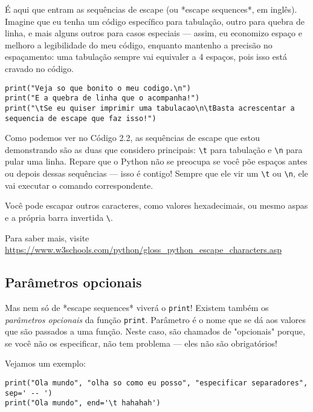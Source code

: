 \documentclass[12pt]{book}
\begin{document}
	É aqui que entram as sequências de escape (ou *escape sequences*, em inglês). Imagine que eu tenha um código específico para tabulação, outro para quebra de linha, e mais alguns outros para casos especiais — assim, eu economizo espaço e melhoro a legibilidade do meu código, enquanto mantenho a precisão no espaçamento: uma tabulação sempre vai equivaler a 4 espaços, pois isso está cravado no código.
	
	\begin{lstlisting}[caption={Sequências de escape}]
print("Veja so que bonito o meu codigo.\n")
print("E a quebra de linha que o acompanha!")
print("\tSe eu quiser imprimir uma tabulacao\n\tBasta acrescentar a sequencia de escape que faz isso!")\end{lstlisting}
	
	Como podemos ver no Código 2.2, as sequências de escape que estou demonstrando são as duas que considero principais: \verb*|\t| para tabulação e \verb*|\n| para pular uma linha. Repare que o Python não se preocupa se você põe espaços antes ou depois dessas sequências — isso é contigo! Sempre que ele vir um \verb*|\t| ou \verb*|\n|, ele vai executar o comando correspondente.
	
	\begin{tcolorbox}[colback=gray!10, colframe=black, title={\large\bfseries Observação}]
		Você pode escapar outros caracteres, como valores hexadecimais, ou mesmo aspas e a própria barra invertida \verb*|\|.
		
		Para saber mais, visite \url{https://www.w3schools.com/python/gloss_python_escape_characters.asp}
	\end{tcolorbox}
	
	\subsection{Parâmetros opcionais}
	
	Mas nem só de *escape sequences* viverá o \texttt{print}! Existem também os \textit{parâmetros opcionais} da função \texttt{print}. Parâmetro é o nome que se dá aos valores que são passados a uma função. Neste caso, são chamados de "opcionais" porque, se você não os especificar, não tem problema — eles não são obrigatórios!
	
	Vejamos um exemplo:
	
	\begin{lstlisting}[caption={Parâmetros opcionais}]
print("Ola mundo", "olha so como eu posso", "especificar separadores", sep=' -- ')
print("Ola mundo", end='\t hahahah')\end{lstlisting}
		
\end{document}
